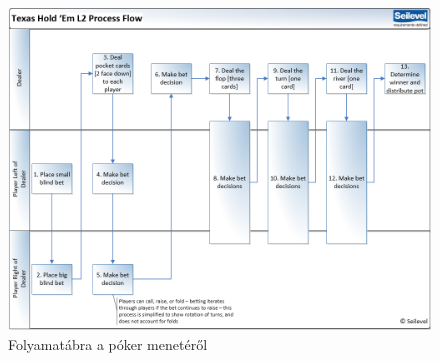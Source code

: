 \begin{figure}[h]
\centering
\includegraphics[width=\textwidth]{images/process-flow.png}
\caption{Folyamatábra a póker menetéről \cite{process-flow}} 
\label{fig:process-flow}
\end{figure}


